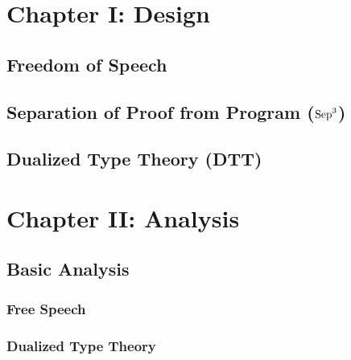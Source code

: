 
\section{Chapter I: Design}
\label{sec:design}

\subsection{Freedom of Speech}
\label{subsec:freedom_of_speech}


\subsection{Separation of Proof from Program ($\text{Sep}^3$) }
\label{subsec:separation_of_proof_from_program}


\subsection{Dualized Type Theory (DTT)}
\label{subsec:dualized_type_theory}



\section{Chapter II: Analysis}
\label{sec:analysis}

\subsection{Basic Analysis}
\label{subsec:basic_analysis}
\subsubsection{Free Speech}
\label{subsubsec:free_speech}


\subsubsection{Dualized Type Theory}
\label{subsubsec:dtt}


